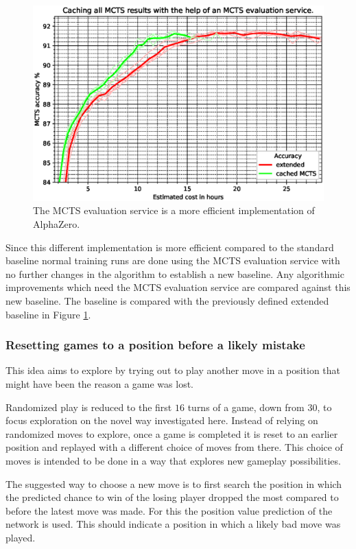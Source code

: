 \documentclass[12pt,onecolumn,oneside,titlepage]{article}
\begin{document}
\begin{figure}[H]
\centering
\includegraphics[clip,width=\columnwidth]{cache_play}
\caption{The MCTS evaluation service is a more efficient implementation of AlphaZero.}
\label{fig:cache_play}
\end{figure}


Since this different implementation is more efficient compared to the standard baseline normal training runs are done using the MCTS evaluation service with no further changes in the algorithm to establish a new baseline.
Any algorithmic improvements which need the MCTS evaluation service are compared against this new baseline. The baseline is compared with the previously defined extended baseline in Figure \ref{fig:cache_play}.



\subsubsection{Resetting games to a position before a likely mistake}

This idea aims to explore by trying out to play another move in a position that might have been the reason a game was lost.

Randomized play is reduced to the first $16$ turns of a game, down from $30$, to focus exploration on the novel way investigated here.
Instead of relying on randomized moves to explore, once a game is completed it is reset to an earlier position and replayed with a different choice of moves from there. This choice of moves is intended to be done in a way that explores new gameplay possibilities.

The suggested way to choose a new move is to first search the position in which the predicted chance to win of the losing player dropped the most compared to before the latest move was made. For this the position value prediction of the network is used.
This should indicate a position in which a likely bad move was played.
\end{document}
